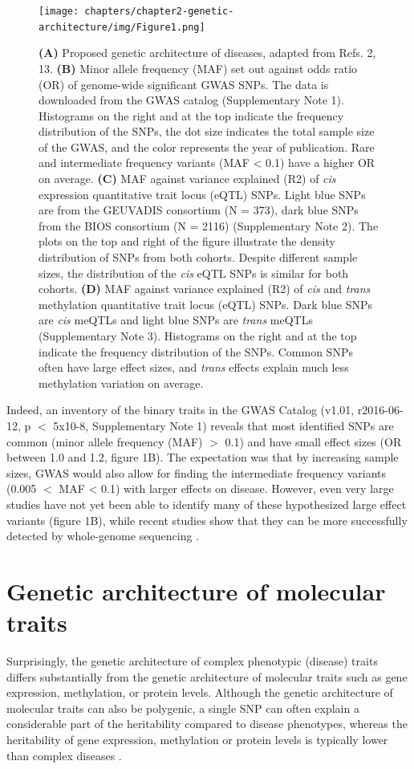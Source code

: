 \begin{figure}[h!]
	\texttt{[image: chapters/chapter2-genetic-architecture/img/Figure1.png]}
	\caption{\textbf{(A)} Proposed genetic architecture of diseases, adapted from Refs. 2, 13. \textbf{(B)} Minor allele frequency (MAF) set out against odds ratio (OR) of genome-wide significant GWAS SNPs. The data is downloaded from the GWAS catalog (Supplementary Note 1). Histograms on the right and at the top indicate the frequency distribution of the SNPs, the dot size indicates the total sample size of the GWAS, and the color represents the year of publication. Rare and intermediate frequency variants (MAF < 0.1) have a higher OR on average. \textbf{(C)} MAF against variance explained (R2) of \emph{cis} expression quantitative trait locus (eQTL) SNPs. Light blue SNPs are from the GEUVADIS consortium (N = 373), dark blue SNPs from the BIOS consortium (N = 2116) (Supplementary Note 2). The plots on the top and right of the figure illustrate the density distribution of SNPs from both cohorts. Despite different sample sizes, the distribution of the \emph{cis} eQTL SNPs is similar for both cohorts. \textbf{(D)} MAF against variance explained (R2) of \emph{cis} and \emph{trans} methylation quantitative trait locus (eQTL) SNPs. Dark blue SNPs are \emph{cis} meQTLs and light blue SNPs are \emph{trans} meQTLs (Supplementary Note 3). Histograms on the right and at the top indicate the frequency distribution of the SNPs. Common SNPs often have large effect sizes, and \emph{trans} effects explain much less methylation variation on average.}
\end{figure}

Indeed, an inventory of the binary traits in the GWAS Catalog (v1.01, r2016-06-12, p $<$ 5x10-8, Supplementary Note 1) reveals that most identified SNPs are common (minor allele frequency (MAF) $>$ 0.1) and have small effect sizes (OR between 1.0 and 1.2, figure 1B). The expectation was that by increasing sample sizes, GWAS would also allow for finding the intermediate frequency variants (0.005 $<$ MAF < 0.1) with larger effects on disease. However, even very large studies have not yet been able to identify many of these hypothesized large effect variants \cite{fuchsbergerGeneticArchitectureType2016} (figure 1B), while recent studies show that they can be more successfully detected by whole-genome sequencing \cite{del-aguilaAlzheimerDiseaseRare2015,UK10KProjectIdentifies2015}.

\section{Genetic architecture of molecular traits}
Surprisingly, the genetic architecture of complex phenotypic (disease) traits differs substantially from the genetic architecture of molecular traits such as gene expression, methylation, or protein levels. Although the genetic architecture of molecular traits can also be polygenic, a single SNP can often explain a considerable part of the heritability compared to disease phenotypes, whereas the heritability of gene expression, methylation or protein levels is typically lower than complex diseases \cite{wrightHeritabilityGenomicsGene2014,poldermanMetaanalysisHeritabilityHuman2015}. 

